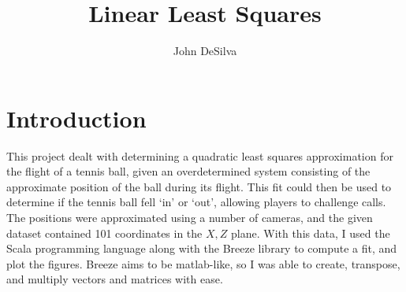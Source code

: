 \documentclass[12pt]{article}
\begin{document}
\title{Linear Least Squares}
\author{John DeSilva}

\maketitle

\section*{Introduction}
This project dealt with determining a quadratic least squares approximation for
the flight of a tennis ball, given an overdetermined system consisting of the
approximate position of the ball during its flight. This fit could then be used
to determine if the tennis ball fell `in' or `out', allowing players to
challenge calls. The positions were approximated using a number of cameras, and
the given dataset contained 101 coordinates in the $X, Z$ plane. With this
data, I used the Scala programming language along with the Breeze library to
compute a fit, and plot the figures.  Breeze aims to be matlab-like, so I was
able to create, transpose, and multiply vectors and matrices with ease.
\end{document}

